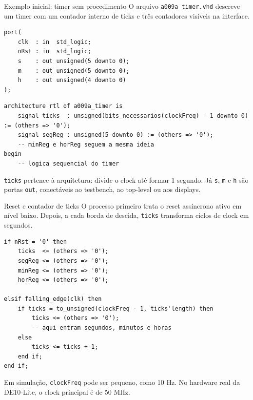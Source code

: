 \documentclass[aspectratio=169,11pt]{beamer}
\begin{document}
\begin{frame}[fragile]{Exemplo inicial: timer sem procedimento}
    O arquivo \texttt{a009a\_timer.vhd} descreve um timer com um contador interno de ticks e três contadores visíveis na interface.

\begin{lstlisting}
port(
    clk  : in  std_logic;
    nRst : in  std_logic;
    s    : out unsigned(5 downto 0);
    m    : out unsigned(5 downto 0);
    h    : out unsigned(4 downto 0)
);
\end{lstlisting}

\begin{lstlisting}
architecture rtl of a009a_timer is
    signal ticks  : unsigned(bits_necessarios(clockFreq) - 1 downto 0) := (others => '0');
    signal segReg : unsigned(5 downto 0) := (others => '0');
    -- minReg e horReg seguem a mesma ideia
begin
    -- logica sequencial do timer
\end{lstlisting}

    \vspace{0.2em}
    \texttt{ticks} pertence à arquitetura: divide o clock até formar 1 segundo. Já \texttt{s}, \texttt{m} e \texttt{h} são portas \texttt{out}, conectáveis ao testbench, ao top-level ou aos displays.
\end{frame}

\begin{frame}[fragile]{Reset e contador de ticks}
    O processo primeiro trata o reset assíncrono ativo em nível baixo. Depois, a cada borda de descida, \texttt{ticks} transforma ciclos de clock em segundos.

\begin{lstlisting}
if nRst = '0' then
    ticks  <= (others => '0');
    segReg <= (others => '0');
    minReg <= (others => '0');
    horReg <= (others => '0');

elsif falling_edge(clk) then
    if ticks = to_unsigned(clockFreq - 1, ticks'length) then
        ticks <= (others => '0');
        -- aqui entram segundos, minutos e horas
    else
        ticks <= ticks + 1;
    end if;
end if;
\end{lstlisting}

    \vspace{0.5em}
    Em simulação, \texttt{clockFreq} pode ser pequeno, como 10 Hz. No hardware real da DE10-Lite, o clock principal é de 50 MHz.
\end{frame}
\end{document}
